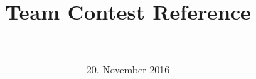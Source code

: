 \documentclass{article}
\title{Team Contest Reference}
\author{\teamname \\ \university}
\date{20. November 2016}
\begin{document}
\maketitle
\setlength{\columnsep}{1cm}

\begin{multicols*}{2}
  
  
  
  
  
  
\end{multicols*}
\end{document}
